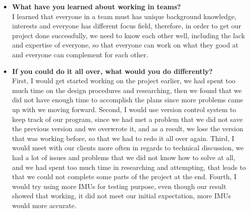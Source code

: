 \begin{itemize}
			\item \textbf{What have you learned about working in teams?}
			\\I learned that everyone in a team must has unique background knowledge, interests and everyone has different focus field, therefore, in order to get our project done successfully, we need to know each other well, including the lack and expertise of everyone, so that everyone can work on what they good at and everyone can complement for each other.\\

			\item \textbf{If you could do it all over, what would you do differently?}
			\\First, I would get started working on the project earlier, we had spent too much time on the design procedures and researching, then we found that we did not have enough time to accomplish the plans since more problems came up with we moving forward. Second, I would use version control system to keep track of our program, since we had met a problem that we did not save the previous version and we overwrote it, and as a result, we lose the version that was working before, so that we had to redo it all over again. Third, I would meet with our clients more often in regards to technical discussion, we had a lot of issues and problems that we did not know how to solve at all, and we had spent too much time in researching and attempting, that leads to that we could not complete some parts of the project at the end. Fourth, I would try using more IMUs for testing purpose, even though our result showed that working, it did not meet our initial expectation, more IMUs would more accurate.\\
		\end{itemize}

